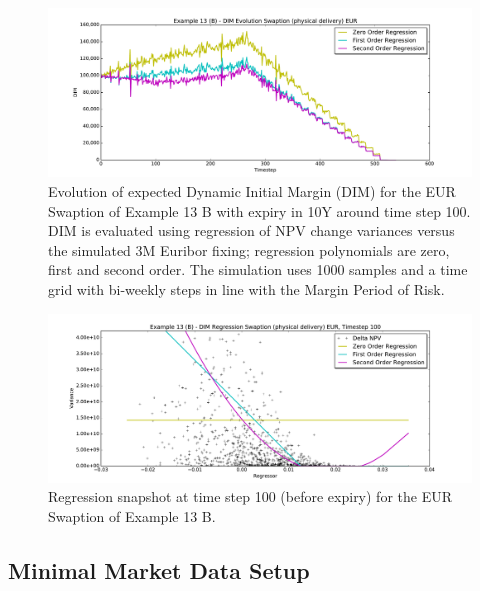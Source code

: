 \documentclass[12pt, a4paper]{article}
\begin{document}
\begin{figure}[h!]
\begin{center}
\includegraphics[scale=0.45]{mpl_dim_evolution_B_swaption_eur.pdf}
\end{center}
\caption{Evolution of expected Dynamic Initial Margin (DIM) for the EUR Swaption of Example 13 B with expiry in 10Y
  around time step 100. DIM is evaluated using regression of NPV change variances versus the simulated 3M Euribor
  fixing; regression polynomials are zero, first and second order. The simulation uses 1000 samples and a time grid with
  bi-weekly steps in line with the Margin Period of Risk.}
\label{fig_ex13b_evolution}
\end{figure}

\begin{figure}[h!]
\begin{center}
\includegraphics[scale=0.45]{mpl_dim_regression_B_swaption_eur_t100.pdf}
\end{center}
\caption{Regression snapshot at time step 100 (before expiry) for the EUR Swaption of Example 13 B.}
\label{fig_ex13b_regression}
\end{figure}

\subsection{Minimal Market Data Setup}
\end{document}
